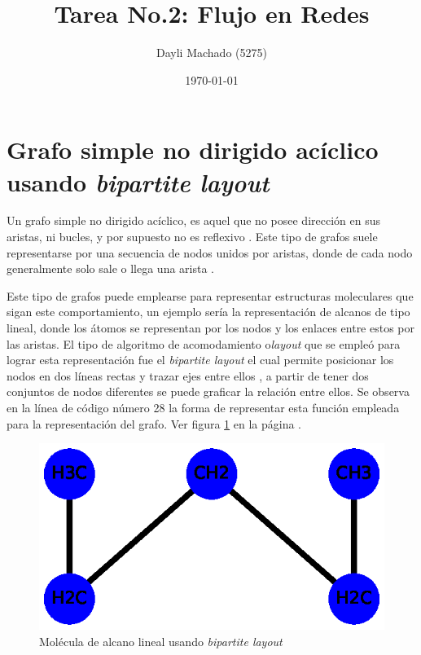 \documentclass{article}
\begin{document}
\title{Tarea No.2: Flujo en Redes}
\author{Dayli Machado (5275)}
\date{\today}
\maketitle



\section{Grafo simple no dirigido acíclico usando \textit{bipartite layout}}

Un grafo simple no dirigido acíclico, es aquel que no posee dirección en sus aristas, ni bucles, y por supuesto no es reflexivo \cite{Elisa}. Este tipo de grafos suele representarse por una secuencia de nodos unidos por aristas, donde de cada nodo generalmente solo sale o llega una arista \cite{Net}. 

Este tipo de grafos puede emplearse para representar estructuras moleculares que sigan este comportamiento, un ejemplo sería la representación de alcanos de tipo lineal, donde los átomos se representan por los nodos y los enlaces entre estos por las aristas. El tipo de algoritmo de acomodamiento o\textit{layout} que se empleó para lograr esta representación fue el \textit{bipartite layout} el cual permite posicionar los nodos en dos líneas rectas y trazar ejes entre ellos \cite{layout}, a partir de tener dos conjuntos de nodos diferentes se puede graficar la relación entre ellos. Se observa en la línea de código número 28 la forma de representar esta función empleada para la representación del grafo. Ver figura \ref{fig:Fig01} en la página \pageref{fig:Fig01}.

\newpage


\begin{figure}[h]
    \centering
    \includegraphics[scale=0.4]{imagenes1/Fig01.eps}
    \caption{Molécula de alcano lineal usando \textit{bipartite layout}}
    \label{fig:Fig01}
\end{figure}
\end{document}
